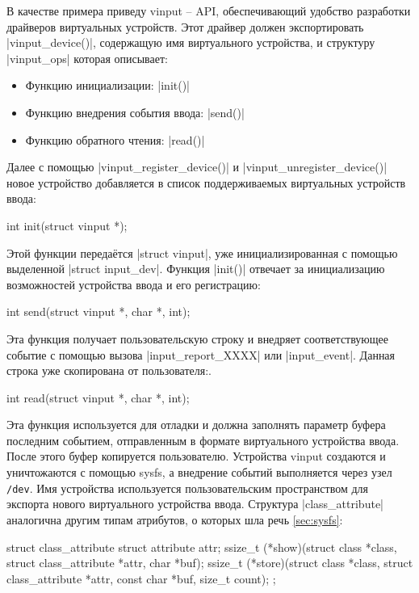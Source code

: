 \documentclass[10pt, oneside]{book}
\begin{document}
В качестве примера приведу vinput – API, обеспечивающий удобство разработки драйверов виртуальных устройств. Этот драйвер должен экспортировать \cpp|vinput_device()|, содержащую имя виртуального устройства, и структуру \cpp|vinput_ops| которая описывает:

\begin{itemize}
    \item Функцию инициализации: \cpp|init()|
    \item Функцию внедрения события ввода: \cpp|send()|
    \item Функцию обратного чтения: \cpp|read()|
\end{itemize}

Далее с помощью \cpp|vinput_register_device()| и \cpp|vinput_unregister_device()| новое устройство добавляется в список поддерживаемых виртуальных устройств ввода:

\begin{code}
int init(struct vinput *);
\end{code}

Этой функции передаётся \cpp|struct vinput|, уже инициализированная с помощью выделенной \cpp|struct input_dev|.
Функция \cpp|init()| отвечает за инициализацию возможностей устройства ввода и его регистрацию:

\begin{code}
int send(struct vinput *, char *, int);
\end{code}

Эта функция получает пользовательскую строку и внедряет соответствующее событие с помощью вызова \cpp|input_report_XXXX| или \cpp|input_event|.
Данная строка уже скопирована от пользователя:.

\begin{code}
int read(struct vinput *, char *, int);
\end{code}

Эта функция используется для отладки и должна заполнять параметр буфера последним событием, отправленным в формате виртуального устройства ввода. После этого буфер копируется пользователю. Устройства vinput создаются и уничтожаются с помощью sysfs, а внедрение событий выполняется через узел \verb|/dev|. Имя устройства используется пользовательским пространством для экспорта нового виртуального устройства ввода.
Структура \cpp|class_attribute| аналогична другим типам атрибутов, о которых шла речь \ref{sec:sysfs}:

\begin{code}
struct class_attribute {
    struct attribute attr;
    ssize_t (*show)(struct class *class, struct class_attribute *attr,
                    char *buf);
    ssize_t (*store)(struct class *class, struct class_attribute *attr,
                    const char *buf, size_t count);
};
\end{code}
\end{document}
